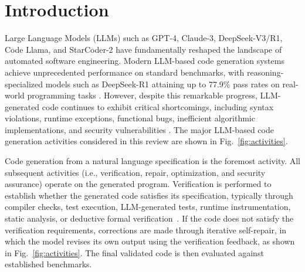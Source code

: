 \documentclass[10pt,a4paper]{article}
\begin{document}
\section{Introduction}
\label{sec:introduction}
Large Language Models (LLMs) such as GPT-4, Claude-3, DeepSeek-V3/R1, Code Llama, and StarCoder-2 have fundamentally reshaped the landscape of automated software engineering. Modern LLM-based code generation systems achieve unprecedented performance on standard benchmarks, with reasoning-specialized models such as DeepSeek-R1 attaining up to 77.9\% pass rates on real-world programming tasks \cite{dou2026}. However, despite this remarkable progress, LLM-generated code continues to exhibit critical shortcomings, including syntax violations, runtime exceptions, functional bugs, inefficient algorithmic implementations, and security vulnerabilities \cite{bruni2025,liu2025llm4tdg}. The major LLM-based code generation activities considered in this review are shown in Fig.~\ref{fig:activities}.

Code generation from a natural language specification is the foremost activity. All subsequent activities (i.e., verification, repair, optimization, and security assurance) operate on the generated program. Verification is performed to establish whether the generated code satisfies its specification, typically through compiler checks, test execution, LLM-generated tests, runtime instrumentation, static analysis, or deductive formal verification~\cite{chen2023selfdebug,liu2025llm4tdg,sun2024clover}. If the code does not satisfy the verification requirements, corrections are made through iterative self-repair, in which the model revises its own output using the verification feedback, as shown in Fig.~\ref{fig:activities}. The final validated code is then evaluated against established benchmarks.
\end{document}
